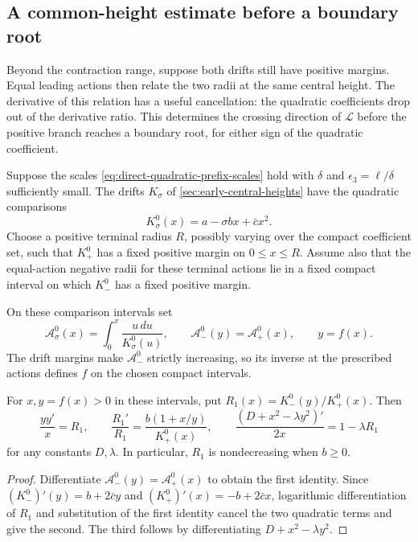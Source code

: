 \subsection{A common-height estimate before a boundary root}
\label{sec:direct-quadratic-prefix}

Beyond the contraction range, suppose both drifts still have positive
margins. Equal leading actions then relate the two radii at the same
central height. The derivative of this relation has a useful
cancellation: the quadratic coefficients drop out of the derivative
ratio. This determines the crossing direction of \(\mathcal L\)
before the positive branch reaches a boundary root, for either sign
of the quadratic coefficient.

Suppose the scales \eqref{eq:direct-quadratic-prefix-scales} hold with
\(\delta\) and \(\epsilon_3=\ell/\delta\) sufficiently small. The drifts
\(K_\sigma\) of \cref{sec:early-central-heights} have the quadratic
comparisons
\[
 K_\sigma^0(x)=a-\sigma bx+\bar c x^2.
\]
Choose a positive terminal radius \(R\), possibly varying
over the compact coefficient set, such that \(K_+^0\)
has a fixed positive margin on \(0\le x\le R\).
Assume also that the equal-action negative radii for these
terminal actions lie in a fixed compact interval on which
\(K_-^0\) has a fixed positive margin.

On these comparison intervals set
\[
 \mathcal A_\sigma^0(x)=\int_0^x\frac{u\,du}{K_\sigma^0(u)},\qquad
 \mathcal A_-^0(y)=\mathcal A_+^0(x),\qquad y=f(x).
\]
The drift margins make \(\mathcal A_-^0\) strictly increasing, so its
inverse at the prescribed actions defines \(f\) on the chosen compact
intervals.

\begin{samepage}
\begin{lemma}
\label{lem:direct-equal-action-comparison}
For \(x,y=f(x)>0\) in these intervals, put
\(R_1(x)=K_-^0(y)/K_+^0(x)\). Then
\begin{equation}
\label{eq:direct-quadratic-critical-identity}
 \frac{yy'}x=R_1,\qquad
 \frac{R_1'}{R_1}
       =\frac{b(1+x/y)}{K_+^0(x)},\qquad
 \frac{(D+x^2-\lambda y^2)'}{2x}=1-\lambda R_1
\end{equation}
for any constants \(D,\lambda\). In particular, \(R_1\) is
nondecreasing when \(b\ge0\).
\end{lemma}

\begin{proof}
Differentiate \(\mathcal A_-^0(y)=\mathcal A_+^0(x)\) to obtain the first identity.
Since \((K_-^0)'(y)=b+2\bar c y\) and
\((K_+^0)'(x)=-b+2\bar c x\), logarithmic differentiation
of \(R_1\) and substitution of the first identity cancel
the two quadratic terms and give the second. The third
follows by differentiating \(D+x^2-\lambda y^2\).
\end{proof}
\end{samepage}

